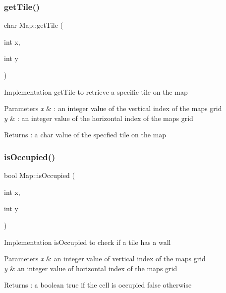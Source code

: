 \subsubsection{\texorpdfstring{get\+Tile()}{getTile()}}
{\footnotesize\ttfamily char Map\+::get\+Tile (\begin{DoxyParamCaption}\item[{int}]{x,  }\item[{int}]{y }\end{DoxyParamCaption})}

Implementation get\+Tile to retrieve a specific tile on the map 
\begin{DoxyParams}{Parameters}
{\em x} & \+: an integer value of the vertical index of the map\textquotesingle{}s grid \\
\hline
{\em y} & \+: an integer value of the horizontal index of the map\textquotesingle{}s grid \\
\hline
\end{DoxyParams}
\begin{DoxyReturn}{Returns}
\+: a char value of the specfied tile on the map 
\end{DoxyReturn}
\hypertarget{class_map_a79e5ced99d160ca9b680661169f16d84}{}\label{class_map_a79e5ced99d160ca9b680661169f16d84} 
\subsubsection{\texorpdfstring{is\+Occupied()}{isOccupied()}}
{\footnotesize\ttfamily bool Map\+::is\+Occupied (\begin{DoxyParamCaption}\item[{int}]{x,  }\item[{int}]{y }\end{DoxyParamCaption})}

Implementation is\+Occupied to check if a tile has a wall 
\begin{DoxyParams}{Parameters}
{\em x} & an integer value of vertical index of the map\textquotesingle{}s grid \\
\hline
{\em y} & an integer value of horizontal index of the map\textquotesingle{}s grid \\
\hline
\end{DoxyParams}
\begin{DoxyReturn}{Returns}
\+: a boolean true if the cell is occupied false otherwise 
\end{DoxyReturn}
\hypertarget{class_map_a57a51049895645c97218ae99f022ec94}{}\label{class_map_a57a51049895645c97218ae99f022ec94} 
